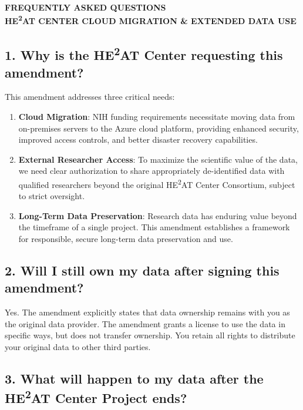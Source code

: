 \documentclass[12pt,letterpaper]{article}
\title{}
\author{}
\date{}
\begin{document}
\begin{center}
\textbf{\LARGE FREQUENTLY ASKED QUESTIONS}\\[0.3cm]
\textbf{\large HE\textsuperscript{2}AT CENTER CLOUD MIGRATION \& EXTENDED DATA USE}
\end{center}

\subsection*{1. Why is the HE\textsuperscript{2}AT Center requesting this amendment?}

This amendment addresses three critical needs:

\begin{enumerate}
\item \textbf{Cloud Migration}: NIH funding requirements necessitate moving data from on-premises servers to the Azure cloud platform, providing enhanced security, improved access controls, and better disaster recovery capabilities.

\item \textbf{External Researcher Access}: To maximize the scientific value of the data, we need clear authorization to share appropriately de-identified data with qualified researchers beyond the original HE\textsuperscript{2}AT Center Consortium, subject to strict oversight.

\item \textbf{Long-Term Data Preservation}: Research data has enduring value beyond the timeframe of a single project. This amendment establishes a framework for responsible, secure long-term data preservation and use.
\end{enumerate}

\subsection*{2. Will I still own my data after signing this amendment?}

Yes. The amendment explicitly states that data ownership remains with you as the original data provider. The amendment grants a license to use the data in specific ways, but does not transfer ownership. You retain all rights to distribute your original data to other third parties.

\subsection*{3. What will happen to my data after the HE\textsuperscript{2}AT Center Project ends?}
\end{document}
